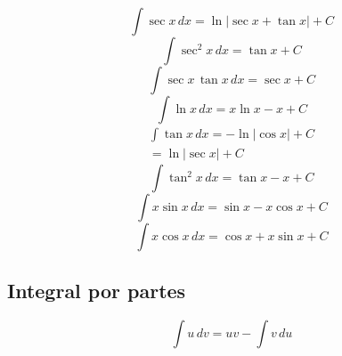 \documentclass[a4paper,12pt,numbers=noenddot]{scrreprt}
\begin{document}
\begin{multicols}{2}
\begin{equation*}
        \end{equation*}
        \begin{equation*}
            \int \sec x \, dx = \ln |\sec x + \tan x| + C
        \end{equation*}
        \begin{equation*}
            \int \sec^2 x \, dx = \tan x + C
        \end{equation*}
        \begin{equation*}
            \int \sec x \, \tan x \, dx = \sec x + C
        \end{equation*}
        \begin{equation*}
            \int \ln x \, dx = x \ln x - x + C
        \end{equation*}
        \begin{align*}
        \int \tan x \, dx = -\ln |\cos x| + C\\=\ln |\sec x| + C
        \end{align*}
        \begin{equation*}
        \int \tan^2 x \, dx = \tan x - x + C   
        \end{equation*}
        \begin{equation*}
        \int x \sin x \, dx = \sin x - x \cos x + C
        \end{equation*}
        \begin{equation*}
        \int x \cos x \, dx = \cos x + x \sin x + C
        \end{equation*}

    \end{multicols}

    \subsection*{Integral por partes}
        \begin{equation*}
            \int u \, dv = uv - \int v \, du
        \end{equation*}
\end{document}
